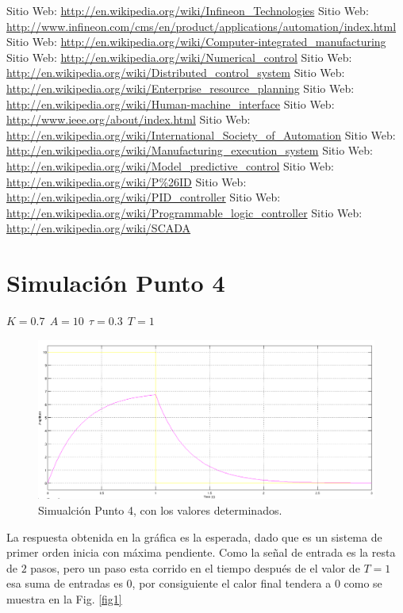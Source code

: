\documentclass[10pt,graphicx,caption,rotating]{article}
\begin{document}
\begin{thebibliography}{99}
 Sitio Web: \url{http://en.wikipedia.org/wiki/Infineon_Technologies}
 Sitio Web: \url{http://www.infineon.com/cms/en/product/applications/automation/index.html}
 Sitio Web: \url{http://en.wikipedia.org/wiki/Computer-integrated_manufacturing}
 Sitio Web: \url{http://en.wikipedia.org/wiki/Numerical_control}
 Sitio Web: \url{http://en.wikipedia.org/wiki/Distributed_control_system}
 Sitio Web: \url{http://en.wikipedia.org/wiki/Enterprise_resource_planning}
 Sitio Web: \url{http://en.wikipedia.org/wiki/Human-machine_interface}
 Sitio Web: \url{http://www.ieee.org/about/index.html}
 Sitio Web: \url{http://en.wikipedia.org/wiki/International_Society_of_Automation}
 Sitio Web: \url{http://en.wikipedia.org/wiki/Manufacturing_execution_system}
 Sitio Web: \url{http://en.wikipedia.org/wiki/Model_predictive_control}
 Sitio Web: \url{http://en.wikipedia.org/wiki/P%26ID}
 Sitio Web: \url{http://en.wikipedia.org/wiki/PID_controller}
 Sitio Web: \url{http://en.wikipedia.org/wiki/Programmable_logic_controller}
 Sitio Web: \url{http://en.wikipedia.org/wiki/SCADA}
\end{thebibliography}

\section{Simulación Punto 4}
\noindent
$K=0.7\ \ A=10 \ \ \tau =0.3 \ \ T=1$
\begin{figure}[H]
	\centering
		\includegraphics[scale=0.5]{figure.png}
	\caption{Simualción Punto 4, con los valores determinados.}
	\label{fig3}
\end{figure}
\noindent
La respuesta obtenida en la gráfica es la esperada, dado que es un sistema de primer orden inicia con máxima pendiente. Como la señal de entrada es la resta de $2$ pasos, pero un paso esta corrido en el tiempo después de el valor de $T=1$ esa suma de entradas es $0$, por consiguiente el calor final tendera a $0$ como se muestra en la Fig. \ref{fig1}
\end{document}
